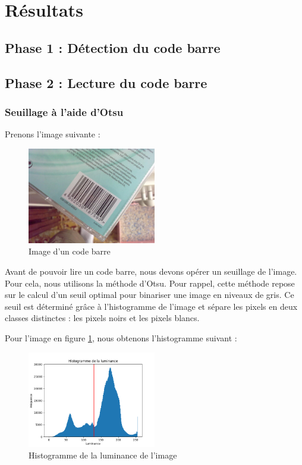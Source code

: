 \documentclass{rapport}
\begin{document}
\section{Résultats}

\subsection{Phase 1 : Détection du code barre}

\subsection{Phase 2 : Lecture du code barre}

\subsubsection*{Seuillage à l'aide d'Otsu}
Prenons l'image suivante :
\begin{figure}[H] %
	\centering
	\includegraphics[width=0.5\textwidth]{images/barcode0.jpg}
	\caption{Image d'un code barre}
	\label{code_barre}
\end{figure}

Avant de pouvoir lire un code barre, nous devons opérer un seuillage de l'image. Pour cela, nous utilisons la méthode d'Otsu.
Pour rappel, cette méthode repose sur le calcul d'un seuil optimal pour binariser une image en niveaux de gris.
Ce seuil est déterminé grâce à l'histogramme de l'image et sépare les pixels en deux classes distinctes : les pixels noirs et les pixels blancs.

Pour l'image en figure \ref{code_barre}, nous obtenons l'histogramme suivant :

\begin{figure}[H] 
	\centering
	\includegraphics[width=0.5\textwidth]{images/histogramme.png}
	\caption{Histogramme de la luminance de l'image}
	\label{histogramme}
\end{figure}
\end{document}
